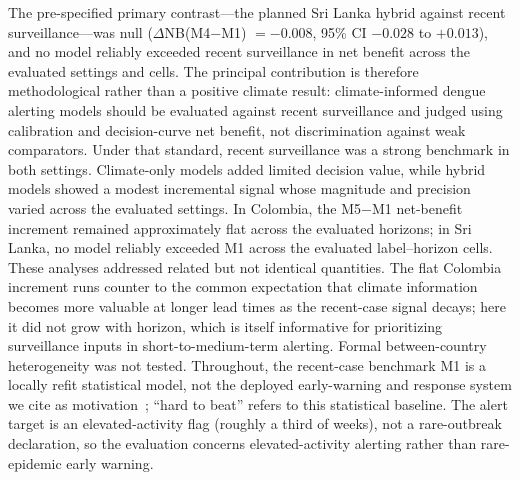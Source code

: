 \documentclass[11pt,a4paper]{article}
\begin{document}
The pre-specified primary contrast---the planned Sri Lanka hybrid against recent surveillance---was null ($\Delta$NB(M4$-$M1) $=-0.008$, 95\% CI $-0.028$ to $+0.013$), and no model reliably exceeded recent surveillance in net benefit across the evaluated settings and cells. The principal contribution is therefore methodological rather than a positive climate result: climate-informed dengue alerting models should be evaluated against recent surveillance and judged using calibration and decision-curve net benefit, not discrimination against weak comparators. Under that standard, recent surveillance was a strong benchmark in both settings. Climate-only models added limited decision value, while hybrid models showed a modest incremental signal whose magnitude and precision varied across the evaluated settings. In Colombia, the M5$-$M1 net-benefit increment remained approximately flat across the evaluated horizons; in Sri Lanka, no model reliably exceeded M1 across the evaluated label--horizon cells. These analyses addressed related but not identical quantities. The flat Colombia increment runs counter to the common expectation that climate information becomes more valuable at longer lead times as the recent-case signal decays; here it did not grow with horizon, which is itself informative for prioritizing surveillance inputs in short-to-medium-term alerting. Formal between-country heterogeneity was not tested. Throughout, the recent-case benchmark M1 is a locally refit statistical model, not the deployed early-warning and response system we cite as motivation~\cite{EWARScsd}; ``hard to beat'' refers to this statistical baseline. The alert target is an elevated-activity flag (roughly a third of weeks), not a rare-outbreak declaration, so the evaluation concerns elevated-activity alerting rather than rare-epidemic early warning.
\end{document}
